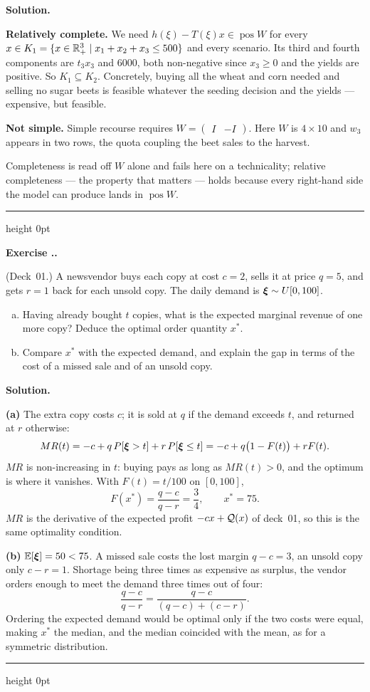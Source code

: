 \documentclass[11pt]{article}
\newcounter{exercisecount}[section]
\renewcommand{\theexercisecount}{\thesection.\arabic{exercisecount}}
\newenvironment{exercise}
  {\par\medskip\refstepcounter{exercisecount}%
   \noindent\textbf{Exercise \theexercisecount.}\begin{itshape}}
  {\end{itshape}\par\medskip}
\newenvironment{solution}
    {\par\nobreak\smallskip\noindent\textbf{Solution.}\par\nobreak\smallskip}
    {\par\medskip\hrule height 0pt\medskip}
\begin{document}
\begin{solution}
\textbf{Relatively complete.} We need $h(\xi) - T(\xi)x \in \operatorname{pos} W$
for every $x \in K_1 = \lbrace x \in {\mathbb{R}}^3_+ \mid x_1+x_2+x_3 \leq 500 \rbrace$
and every scenario. Its third and fourth components are $t_3x_3$ and $6000$,
both non-negative since $x_3 \geq 0$ and the yields are positive. So
$K_1 \subseteq K_2$. Concretely, buying all the wheat and corn needed and selling
no sugar beets is feasible whatever the seeding decision and the yields ---
expensive, but feasible.

\textbf{Not simple.} Simple recourse requires $W = \begin{pmatrix} I & -I \end{pmatrix}$.
Here $W$ is $4 \times 10$ and $w_3$ appears in two rows, the quota coupling the
beet sales to the harvest.

\medskip
Completeness is read off $W$ alone and fails here on a technicality; relative
completeness --- the property that matters --- holds because every right-hand
side the model can produce lands in $\operatorname{pos} W$.
\end{solution}

\begin{exercise}
(Deck~01.) A newsvendor buys each copy at cost $c = 2$, sells it at price
$q = 5$, and gets $r = 1$ back for each unsold copy. The daily demand is
${\boldsymbol{\xi}} \sim U[0,100]$.
\begin{enumerate}[(a)]
\item Having already bought $t$ copies, what is the expected marginal revenue of
one more copy? Deduce the optimal order quantity $x^*$.
\item Compare $x^*$ with the expected demand, and explain the gap in terms of
the cost of a missed sale and of an unsold copy.
\end{enumerate}
\end{exercise}

\begin{solution}
\textbf{(a)} The extra copy costs $c$; it is sold at $q$ if the demand exceeds
$t$, and returned at $r$ otherwise:
\[
MR(t) = -c + q\,P[{\boldsymbol{\xi}} > t] + r\,P[{\boldsymbol{\xi}} \leq t] = -c + q\big(1 - F(t)\big) + rF(t).
\]
$MR$ is non-increasing in $t$: buying pays as long as $MR(t) > 0$, and the
optimum is where it vanishes. With $F(t) = t/100$ on $[0,100]$,
\[
F(x^*) = \frac{q-c}{q-r} = \frac34, \qquad x^* = 75 .
\]
$MR$ is the derivative of the expected profit $-cx + {\mathcal{Q}}(x)$ of deck~01, so
this is the same optimality condition.

\textbf{(b)} ${\mathbb{E}}[{\boldsymbol{\xi}}] = 50 < 75$. A missed sale costs the lost margin
$q - c = 3$, an unsold copy only $c - r = 1$. Shortage being three times as
expensive as surplus, the vendor orders enough to meet the demand three times
out of four:
\[
\frac{q-c}{q-r} = \frac{q-c}{(q-c) + (c-r)} .
\]
Ordering the expected demand would be optimal only if the two costs were equal,
making $x^*$ the median, and the median coincided with the mean, as for a
symmetric distribution.
\end{solution}
\end{document}
